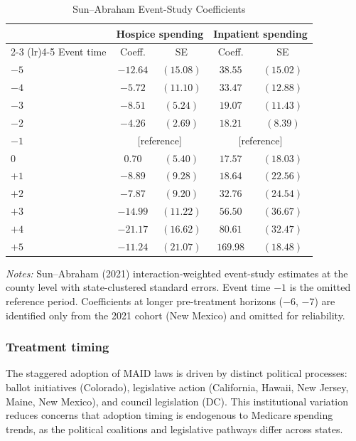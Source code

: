 \documentclass[12pt]{article}
\begin{document}
\begin{table}[H]
\centering
\caption{Sun--Abraham Event-Study Coefficients}
\label{tab:event_study}
\begin{threeparttable}
\begin{tabular}{lcccc}
\toprule
& \multicolumn{2}{c}{Hospice spending} & \multicolumn{2}{c}{Inpatient spending} \\
\cmidrule(lr){2-3} \cmidrule(lr){4-5}
Event time & Coeff. & SE & Coeff. & SE \\
\midrule
$-5$ & $-12.64$ & $(15.08)$ & $38.55$ & $(15.02)$ \\
$-4$ & $-5.72$ & $(11.10)$ & $33.47$ & $(12.88)$ \\
$-3$ & $-8.51$ & $(5.24)$ & $19.07$ & $(11.43)$ \\
$-2$ & $-4.26$ & $(2.69)$ & $18.21$ & $(8.39)$ \\
$-1$ & \multicolumn{2}{c}{[reference]} & \multicolumn{2}{c}{[reference]} \\
$0$ & $0.70$ & $(5.40)$ & $17.57$ & $(18.03)$ \\
$+1$ & $-8.89$ & $(9.28)$ & $18.64$ & $(22.56)$ \\
$+2$ & $-7.87$ & $(9.20)$ & $32.76$ & $(24.54)$ \\
$+3$ & $-14.99$ & $(11.22)$ & $56.50$ & $(36.67)$ \\
$+4$ & $-21.17$ & $(16.62)$ & $80.61$ & $(32.47)$ \\
$+5$ & $-11.24$ & $(21.07)$ & $169.98$ & $(18.48)$ \\
\bottomrule
\end{tabular}
\begin{tablenotes}[flushleft]
\small
\item \textit{Notes:} Sun--Abraham (2021) interaction-weighted event-study estimates at the county level with state-clustered standard errors. Event time $-1$ is the omitted reference period. Coefficients at longer pre-treatment horizons ($-6$, $-7$) are identified only from the 2021 cohort (New Mexico) and omitted for reliability.
\end{tablenotes}
\end{threeparttable}
\end{table}

\subsubsection*{Treatment timing}
The staggered adoption of MAID laws is driven by distinct political processes: ballot initiatives (Colorado), legislative action (California, Hawaii, New Jersey, Maine, New Mexico), and council legislation (DC). This institutional variation reduces concerns that adoption timing is endogenous to Medicare spending trends, as the political coalitions and legislative pathways differ across states.
\end{document}
